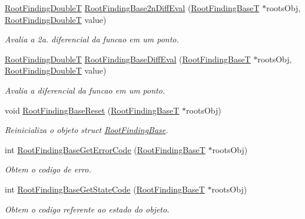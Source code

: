 \begin{CompactItemize}
\hyperlink{RootFindingCommon_8h_a296fe63994e03408c4ad62794d472e9}{RootFindingDoubleT} \hyperlink{group____roots_g328a1c4011dcb869d32a8b566d1c4b67}{RootFindingBase2nDiffEval} (\hyperlink{structRootFindingBase}{RootFindingBaseT} $\ast$rootsObj, \hyperlink{RootFindingCommon_8h_a296fe63994e03408c4ad62794d472e9}{RootFindingDoubleT} value)
\begin{CompactList}\small\item\em Avalia a 2a. diferencial da funcao em um ponto. \item\end{CompactList}\item 
\hyperlink{RootFindingCommon_8h_a296fe63994e03408c4ad62794d472e9}{RootFindingDoubleT} \hyperlink{group____roots_g4971f377f5d7fdf4d2a55ed324955f09}{RootFindingBaseDiffEval} (\hyperlink{structRootFindingBase}{RootFindingBaseT} $\ast$rootsObj, \hyperlink{RootFindingCommon_8h_a296fe63994e03408c4ad62794d472e9}{RootFindingDoubleT} value)
\begin{CompactList}\small\item\em Avalia a diferencial da funcao em um ponto. \item\end{CompactList}\item 
void \hyperlink{group____roots_gafb0a57a39081653e224b3b7e95774f0}{RootFindingBaseReset} (\hyperlink{structRootFindingBase}{RootFindingBaseT} $\ast$rootsObj)
\begin{CompactList}\small\item\em Reinicializa o objeto struct \hyperlink{structRootFindingBase}{RootFindingBase}. \item\end{CompactList}\item 
int \hyperlink{group____roots_gbcf354e731e02c63652af3a2058e739d}{RootFindingBaseGetErrorCode} (\hyperlink{structRootFindingBase}{RootFindingBaseT} $\ast$rootsObj)
\begin{CompactList}\small\item\em Obtem o codigo de erro. \item\end{CompactList}\item 
int \hyperlink{group____roots_g1712b9a29b6e6b15df2195319d5f5d70}{RootFindingBaseGetStateCode} (\hyperlink{structRootFindingBase}{RootFindingBaseT} $\ast$rootsObj)
\begin{CompactList}\small\item\em Obtem o codigo referente ao estado do objeto. \item\end{CompactList}\item 

\end{CompactItemize}
